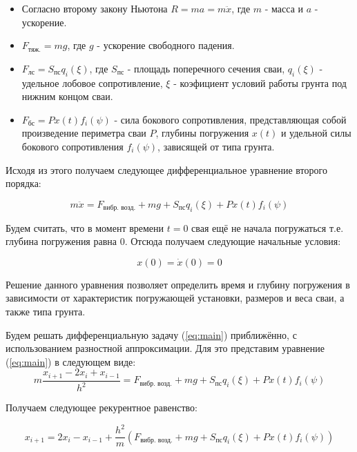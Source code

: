 \begin{itemize}
\item Согласно второму закону Ньютона $R = ma = m\ddot{x}$, где $m$ - масса и $a$ - ускорение.
\item $F_\text{тяж.} = mg$, где $g$ - ускорение свободного падения.
\item $F_\text{лс} = S_\text{пс} q_i(\xi)$, где $S_\text{пс}$ - площадь поперечного сечения сваи,
$q_i(\xi)$ - удельное лобовое сопротивление, $\xi$ - коэфициент условий работы грунта под нижним концом сваи.
\item $F_\text{бс} = P x(t) f_i(\psi)$ - сила бокового сопротивления, представляющая собой произведение периметра сваи
$P$, глубины погружения $x(t)$ и удельной силы бокового сопротивления $f_i(\psi)$, зависящей от типа грунта.
\end{itemize}

\noindent Исходя из этого получаем следующее дифференциальное уравнение второго порядка:

\begin{equation}
    \label{eq:main}
    m\ddot{x} = F_\text{вибр. возд.} + mg + S_\text{пс} q_i(\xi) + P x(t) f_i(\psi)
\end{equation}

\noindent Будем считать, что в момент времени $t = 0$ свая ещё не начала погружаться т.е.
глубина погружения равна 0. Отсюда получаем следующие начальные условия:

\begin{equation}
    x(0) = \dot{x}(0) = 0
\end{equation}

Решение данного уравнения позволяет определить время и глубину погружения в зависимости от характеристик погружающей
установки, размеров и веса сваи, а также типа грунта.

Будем решать дифференциальную задачу (\ref{eq:main}) приближённо, с использованием разностной аппроксимации.
Для это представим уравнение (\ref{eq:main}) в следующем виде:
\begin{equation}
        m\frac{x_{i+1} - 2x_i + x_{i-1}}{h^2} = F_\text{вибр. возд.} + mg + S_\text{пс} q_i(\xi)+ P x(t) f_i(\psi)
\end{equation}

Получаем следующее рекурентное равенство:

\begin{equation}
    \label{eq:result}
    x_{i+1} = 2x_i - x_{i-1} + \frac{h^2}{m}(F_\text{вибр. возд.} + mg + S_\text{пс} q_i(\xi) + P x(t) f_i(\psi))
\end{equation}

